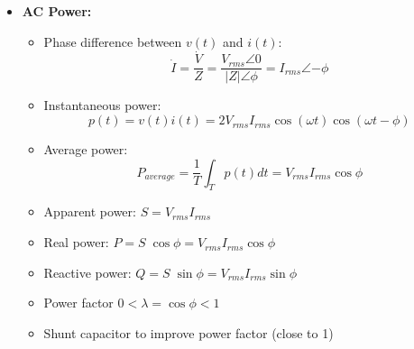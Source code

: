\documentclass{article}
\begin{document}
\begin{itemize}
\item {\bf AC Power:}
  \begin{itemize}
  \item Phase difference between $v(t)$ and $i(t)$:
    \begin{equation} 
      \dot{I}=\frac{\dot{V}}{Z}=\frac{V_{rms}\angle 0}{|Z|\angle{\phi}}
      =I_{rms}\angle{-\phi}	
    \end{equation}
  \item Instantaneous power:	
    \begin{equation} 
      p(t)=v(t) i(t)=2V_{rms}I_{rms}\cos(\omega t)\cos(\omega t-\phi) 
    \end{equation}
  \item Average power:
    \begin{equation}
      P_{average}=\frac{1}{T}\int_T p(t) dt=V_{rms}I_{rms} \cos \phi 
    \end{equation}
  \item Apparent power: $ S=V_{rms} I_{rms}$
  \item Real power: $P=S \; \cos\phi=V_{rms} I_{rms} \cos \phi$
  \item Reactive power: $Q=S \; \sin\phi=V_{rms} I_{rms} \sin \phi$
  \item Power factor $0 < \lambda=\cos \phi < 1$
  \item Shunt capacitor to improve power factor (close to 1)
  \end{itemize}


\end{itemize}
\end{document}
